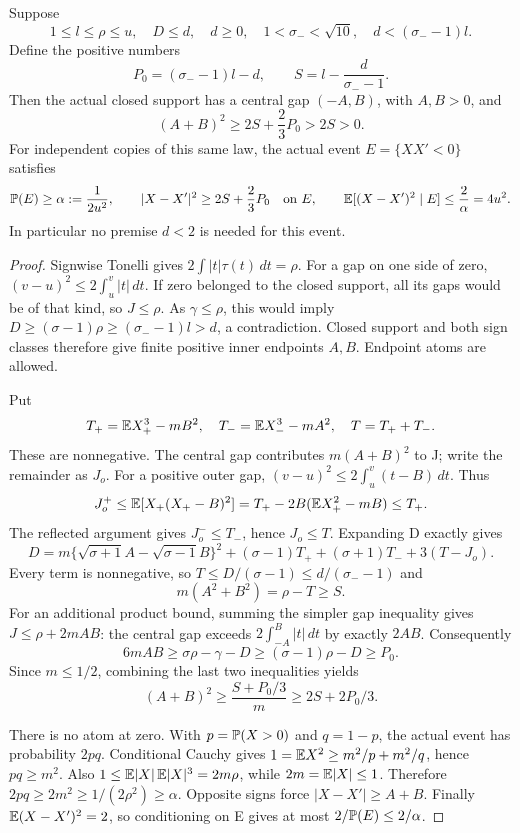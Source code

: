 \begin{lemma}\label{v6gap:event}
Suppose
\[
 1\le l\le\rho\le u,\quad D\le d,\quad d\ge0,\quad
 1<\sigma_-<\sqrt{10},\quad d<(\sigma_--1)l.
\]
Define the positive numbers
\[
 P_0=(\sigma_--1)l-d,\qquad S=l-\frac{d}{\sigma_--1}.
\]
Then the actual closed support has a central gap $(-A,B)$, with
$A,B>0$, and
\begin{equation}\label{v6gap:distance}
 (A+B)^2\ge 2S+\frac23P_0>2S>0.
\end{equation}
For independent copies of this same law, the actual event $E=\{XX'<0\}$
satisfies
\begin{equation}\label{v6gap:high-input}
 \mathbb P(E)\ge\alpha:=\frac1{2u^2},\qquad
 |X-X'|^2\ge2S+\frac23P_0\quad\hbox{on }E,\qquad
 \mathbb E[(X-X')^2\mid E]\le\frac2\alpha=4u^2.
\end{equation}
In particular no premise $d<2$ is needed for this event.
\end{lemma}
\begin{proof}
Signwise Tonelli gives $2\int|t|\tau(t)\,dt=\rho$.
For a gap on one side of zero, $(v-u)^2\le2\int_u^v|t|\,dt$.
If zero belonged to the closed support, all its gaps would be of that
kind, so $J\le\rho$. As $\gamma\le\rho$, this would imply
$D\ge(\sigma-1)\rho\ge(\sigma_--1)l>d$, a contradiction.
Closed support and both sign classes therefore give finite positive
inner endpoints $A,B$. Endpoint atoms are allowed.

Put
\[
 T_+=\mathbb E X_+^3-mB^2,\quad T_-=\mathbb E X_-^3-mA^2,\quad T=T_++T_-.
\]
These are nonnegative. The central gap contributes $m(A+B)^2$ to J;
write the remainder as $J_o$. For a positive outer gap,
$(v-u)^2\le2\int_u^v(t-B)\,dt$. Thus
\[
 J_o^+\le\mathbb E[X_+(X_+-B)^2]
       =T_+-2B(\mathbb E X_+^2-mB)\le T_+.
\]
The reflected argument gives $J_o^-\le T_-$, hence $J_o\le T$.
Expanding D exactly gives
\[
 D=m\{\sqrt{\sigma+1}A-\sqrt{\sigma-1}B\}^2
       +(\sigma-1)T_++(\sigma+1)T_-+3(T-J_o).
\]
Every term is nonnegative, so
$T\le D/(\sigma-1)\le d/(\sigma_--1)$ and
\[
 m(A^2+B^2)=\rho-T\ge S.
\]
For an additional product bound, summing the simpler gap inequality
gives $J\le\rho+2mAB$: the central gap exceeds
$2\int_{-A}^{B}|t|\,dt$ by exactly $2AB$.
Consequently
\[
 6mAB\ge\sigma\rho-\gamma-D
            \ge(\sigma-1)\rho-D\ge P_0.
\]
Since $m\le1/2$, combining the last two inequalities yields
\[
 (A+B)^2\ge\frac{S+P_0/3}{m}\ge2S+2P_0/3.
\]

There is no atom at zero. With $p=\mathbb P(X>0)$ and $q=1-p$,
the actual event has probability $2pq$. Conditional Cauchy gives
$1=\mathbb E X^2\ge m^2/p+m^2/q$, hence $pq\ge m^2$.
Also $1\le\mathbb E|X|\,\mathbb E|X|^3=2m\rho$, while
$2m=\mathbb E|X|\le1$. Therefore $2pq\ge2m^2\ge1/(2\rho^2)\ge\alpha$.
Opposite signs force $|X-X'|\ge A+B$. Finally
$\mathbb E(X-X')^2=2$, so conditioning on E gives at most
$2/\mathbb P(E)\le2/\alpha$.
\end{proof}

